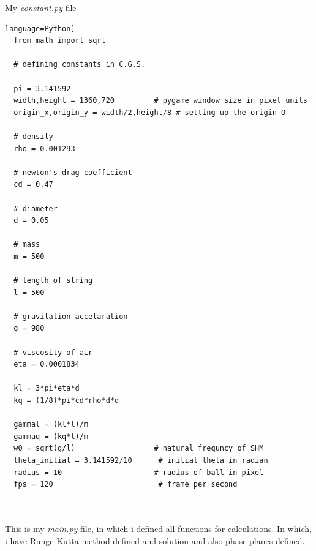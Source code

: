 \documentclass[11pt,a4paper]{article}
\begin{document}
My \emph{constant.py} file

\begin{lstlisting}language=Python]
  from math import sqrt

  # defining constants in C.G.S.

  pi = 3.141592
  width,height = 1360,720         # pygame window size in pixel units
  origin_x,origin_y = width/2,height/8 # setting up the origin O

  # density
  rho = 0.001293

  # newton's drag coefficient
  cd = 0.47

  # diameter
  d = 0.05

  # mass 
  m = 500

  # length of string
  l = 500

  # gravitation accelaration
  g = 980

  # viscosity of air
  eta = 0.0001834

  kl = 3*pi*eta*d
  kq = (1/8)*pi*cd*rho*d*d

  gammal = (kl*l)/m
  gammaq = (kq*l)/m
  w0 = sqrt(g/l)                  # natural frequncy of SHM
  theta_initial = 3.141592/10      # initial theta in radian
  radius = 10                     # radius of ball in pixel
  fps = 120                        # frame per second



\end{lstlisting}

This is my \emph{main.py} file, in which i defined all functions for calculations. In which, i have Runge-Kutta method defined and solution and also phase planes defined.
\end{document}
